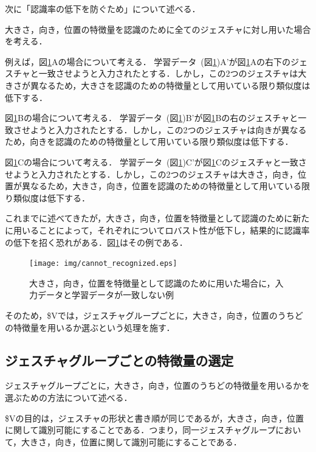 次に「認識率の低下を防ぐため」について述べる．

大きさ，向き，位置の特徴量を認識のために全てのジェスチャに対し用いた場合を考える．

例えば，図\ref{fig:cannot_recognized}Aの場合について考える．
学習データ~(図\ref{fig:cannot_recognized})A'が図\ref{fig:cannot_recognized}Aの右下のジェスチャと一致させようと入力されたとする．しかし，この2つのジェスチャは大きさが異なるため，大きさを認識のための特徴量として用いている限り類似度は低下する．

図\ref{fig:cannot_recognized}Bの場合について考える．
学習データ~(図\ref{fig:cannot_recognized})B'が図\ref{fig:cannot_recognized}Bの右のジェスチャと一致させようと入力されたとする．しかし，この2つのジェスチャは向きが異なるため，向きを認識のための特徴量として用いている限り類似度は低下する．

図\ref{fig:cannot_recognized}Cの場合について考える．
学習データ~(図\ref{fig:cannot_recognized})C'が図\ref{fig:cannot_recognized}Cのジェスチャと一致させようと入力されたとする．しかし，この2つのジェスチャは大きさ，向き，位置が異なるため，大きさ，向き，位置を認識のための特徴量として用いている限り類似度は低下する．

これまでに述べてきたが，大きさ，向き，位置を特徴量として認識のために新たに用いることによって，それぞれについてロバスト性が低下し，結果的に認識率の低下を招く恐れがある．図\ref{fig:cannot_recognized}はその例である．

\begin{figure} [h!]
	\begin{center}
		\texttt{[image: img/cannot\_recognized.eps]}
	\end{center}
	\caption{大きさ，向き，位置を特徴量として認識のために用いた場合に，入力データと学習データが一致しない例}
	\label{fig:cannot_recognized}
\end{figure}

そのため，\$Vでは，ジェスチャグループごとに，大きさ，向き，位置のうちどの特徴量を用いるか選ぶという処理を施す．

\subsection{ジェスチャグループごとの特徴量の選定}
ジェスチャグループごとに，大きさ，向き，位置のうちどの特徴量を用いるかを選ぶための方法について述べる．

\$Vの目的は，ジェスチャの形状と書き順が同じであるが，大きさ，向き，位置に関して識別可能にすることである．つまり，同一ジェスチャグループにおいて，大きさ，向き，位置に関して識別可能にすることである．

